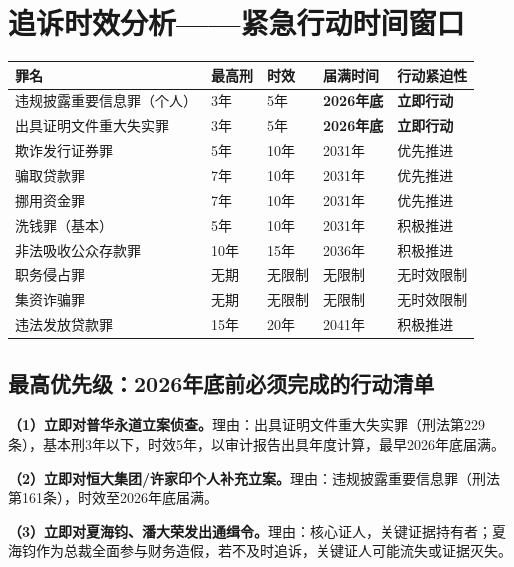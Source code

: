 \documentclass[11pt,a4paper,oneside,openany]{article}
\begin{document}
\section{追诉时效分析——紧急行动时间窗口}
\begin{threeparttable}
\caption{追诉时效紧急程度矩阵（2026年至2041年）}
\begin{tabular}{p{3.5cm}p{1.4cm}p{1.8cm}p{2.5cm}p{3cm}}
\toprule
\textbf{罪名} & \textbf{最高刑} & \textbf{时效} & \textbf{届满时间} & \textbf{行动紧迫性} \\
\midrule
违规披露重要信息罪（个人） & 3年 & 5年 & \cellcolor{highrisk}\textbf{2026年底} & \textbf{立即行动} \\
出具证明文件重大失实罪 & 3年 & 5年 & \cellcolor{highrisk}\textbf{2026年底} & \textbf{立即行动} \\
欺诈发行证券罪 & 5年 & 10年 & \cellcolor{rowalt}2031年 & 优先推进 \\
骗取贷款罪 & 7年 & 10年 & \cellcolor{rowalt}2031年 & 优先推进 \\
挪用资金罪 & 7年 & 10年 & \cellcolor{rowalt}2031年 & 优先推进 \\
洗钱罪（基本） & 5年 & 10年 & 2031年 & 积极推进 \\
非法吸收公众存款罪 & 10年 & 15年 & 2036年 & 积极推进 \\
职务侵占罪 & 无期 & 无限制 & \cellcolor{rowalt}无限制 & 无时效限制 \\
集资诈骗罪 & 无期 & 无限制 & \cellcolor{rowalt}无限制 & 无时效限制 \\
违法发放贷款罪 & 15年 & 20年 & \cellcolor{rowalt}2041年 & 积极推进 \\
\bottomrule
\end{tabular}
\end{threeparttable}

\subsection{最高优先级：2026年底前必须完成的行动清单}
\textbf{（1）立即对普华永道立案侦查。}理由：出具证明文件重大失实罪（刑法第229条），基本刑3年以下，时效5年，以审计报告出具年度计算，最早2026年底届满。

\textbf{（2）立即对恒大集团/许家印个人补充立案。}理由：违规披露重要信息罪（刑法第161条），时效至2026年底届满。

\textbf{（3）立即对夏海钧、潘大荣发出通缉令。}理由：核心证人，关键证据持有者；夏海钧作为总裁全面参与财务造假，若不及时追诉，关键证人可能流失或证据灭失。

\newpage
\end{document}
